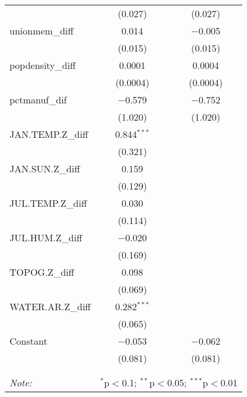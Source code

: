 \begin{table}[!htbp]
\begin{tabular}{@{\extracolsep{5pt}}lcc}
  & (0.027) & (0.027) \\ 
  unionmem\_diff & 0.014 & $-$0.005 \\ 
  & (0.015) & (0.015) \\ 
  popdensity\_diff & 0.0001 & 0.0004 \\ 
  & (0.0004) & (0.0004) \\ 
  pctmanuf\_dif & $-$0.579 & $-$0.752 \\ 
  & (1.020) & (1.020) \\ 
  JAN.TEMP.Z\_diff & 0.844$^{***}$ &  \\ 
  & (0.321) &  \\ 
  JAN.SUN.Z\_diff & 0.159 &  \\ 
  & (0.129) &  \\ 
  JUL.TEMP.Z\_diff & 0.030 &  \\ 
  & (0.114) &  \\ 
  JUL.HUM.Z\_diff & $-$0.020 &  \\ 
  & (0.169) &  \\ 
  TOPOG.Z\_diff & 0.098 &  \\ 
  & (0.069) &  \\ 
  WATER.AR.Z\_diff & 0.282$^{***}$ &  \\ 
  & (0.065) &  \\ 
  Constant & $-$0.053 & $-$0.062 \\ 
  & (0.081) & (0.081) \\ 
 \hline \\[-1.8ex] 
\hline 
\hline \\[-1.8ex] 
\textit{Note:}  & \multicolumn{2}{r}{$^{*}$p$<$0.1; $^{**}$p$<$0.05; $^{***}$p$<$0.01} \\ 
\end{tabular} 
\end{table} 
